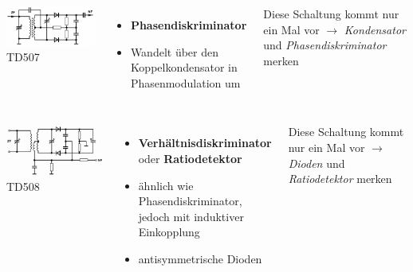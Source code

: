 \begin{frame}
  \begin{columns}
    \includegraphics[width=\textwidth,height=.85\textheight,keepaspectratio]{a12/td507.png}\\
    {\tiny TD507}
    \begin{itemize}
      \item \textbf{Phasendiskriminator}
      \item Wandelt über den Koppelkondensator in Phasenmodulation um 
    \end{itemize}
    {\small Diese Schaltung kommt nur ein Mal vor $\rightarrow$ \emph{Kondensator} und \emph{Phasendiskriminator} merken}
  \end{columns}
\end{frame}

\begin{frame}
  \begin{columns}
    \includegraphics[width=\textwidth,height=.85\textheight,keepaspectratio]{a12/td508.png}\\
    {\tiny TD508}
    \begin{itemize}
      \item \textbf{Verhältnisdiskriminator} oder \textbf{Ratiodetektor}
      \item ähnlich wie Phasendiskriminator, jedoch mit induktiver Einkopplung
      \item antisymmetrische Dioden 
    \end{itemize}
    {\small Diese Schaltung kommt nur ein Mal vor $\rightarrow$ \emph{Dioden} und \emph{Ratiodetektor} merken}
  \end{columns}
\end{frame}

